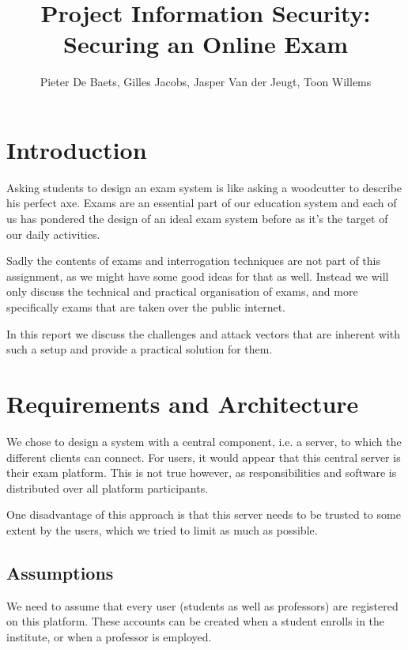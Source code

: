 \documentclass[12pt]{article}
\title{Project Information Security: \\ \textbf{Securing an Online Exam}}
\author{Pieter De Baets, Gilles Jacobs, Jasper Van der Jeugt, Toon Willems}
\begin{document}
\makeatletter
\renewcommand\tableofcontents{}
\makeatother

\maketitle
\tableofcontents

\newpage

\section{Introduction}
\label{sec:introduction}

Asking students to design an exam system is like asking a woodcutter to describe
his perfect axe. Exams are an essential part of our education system and each of
us has pondered the design of an ideal exam system before as it's the target of
our daily activities.

Sadly the contents of exams and interrogation techniques are not part of this
assignment, as we might have some good ideas for that as well. Instead we will
only discuss the technical and practical organisation of exams, and more
specifically exams that are taken over the public internet.

In this report we discuss the challenges and attack vectors that are inherent
with such a setup and provide a practical solution for them.

\section{Requirements and Architecture}
\label{sec:requirements}

We chose to design a system with a central component, i.e. a server, to which
the different clients can connect. For users, it would appear that this central
server is their exam platform. This is not true however, as responsibilities and
software is distributed over all platform participants.

One disadvantage of this approach is that this server needs to be trusted to
some extent by the users, which we tried to limit as much as possible.

\subsection{Assumptions}
\label{subsec:req-assumptions}

We need to assume that every user (students as well as professors) are
registered on this platform. These accounts can be created when a student
enrolls in the institute, or when a professor is employed.
\end{document}
